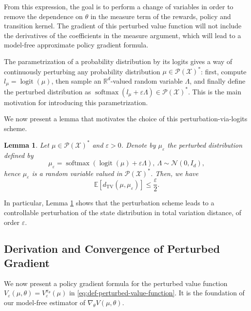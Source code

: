\documentclass[11pt]{article}
\numberwithin{equation}{section}
\newtheorem{lemma}[theorem]{Lemma}
\theoremstyle{definition}
\theoremstyle{remark}
\def\eps{\varepsilon}
\def\tv{\mathrm{TV}}
\def\cP{\mathcal{P}}
\def\cX{\mathcal{X}}
\def\R{{\mathbb R}}
\DeclareMathOperator*{\logit}{logit}
\DeclareMathOperator*{\softmax}{softmax}
\begin{document}
From this expression, the goal is to perform a change of variables in order to remove the dependence on $\theta$ in the measure term of the rewards, policy and transition kernel. The gradient of this perturbed value function will not include the derivatives of the coefficients in the measure argument, which will lead to a model-free approximate policy gradient formula.

 The parametrization of a probability distribution by its logits gives a way of continuously perturbing any probability distribution $\mu \in \cP (\cX)^*$: 
 first, compute $l_{\mu} = \logit (\mu)$, then sample an $\R^{d}$-valued random variable $\Lambda$, and finally define the perturbed distribution as $\softmax (l_\mu + \eps \Lambda) \in \cP (\cX)^*$. This is the main motivation for introducing this parametrization.

We now present a lemma that motivates the choice of this perturbation-via-logits scheme.

\begin{lemma}
    \label{lemma:tv-bound}
    Let $\mu \in \cP (\cX)^*$ and $\eps > 0$. Denote by $\mu_\eps$ the perturbed distribution defined by 
    \[
    \mu_\eps = \softmax (\logit (\mu) + \eps \Lambda), \: \Lambda \sim \mathcal N (0, I_d),
    \]
    hence $\mu_\eps$ is a random variable valued in $\cP (\cX)^*$. Then, we have
    \begin{equation}
        \label{eq:tv-bound}
        \mathbb E[d_\tv(\mu, \mu_\eps)] \leq \frac{\eps}{2}.
    \end{equation}
\end{lemma}

In particular, Lemma \ref{lemma:tv-bound} shows that the perturbation scheme leads to a controllable perturbation of the state distribution in total variation distance, of order $\eps$.

\subsection{Derivation and Convergence of Perturbed Gradient}

We now present a policy gradient formula for the perturbed value function $V_\eps(\mu, \theta) = V_\eps^{\pi_\theta}(\mu)$ in \eqref{eq:def-perturbed-value-function}. 
It is the foundation of our model-free estimator of $\nabla_\theta V(\mu, \theta)$.
\end{document}
